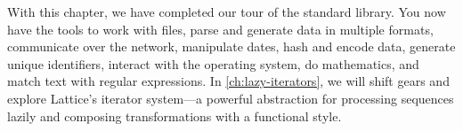 With this chapter, we have completed our tour of the standard library.
You now have the tools to work with files, parse and generate data in
multiple formats, communicate over the network, manipulate dates, hash and
encode data, generate unique identifiers, interact with the operating system,
do mathematics, and match text with regular expressions. In
\cref{ch:lazy-iterators}, we will shift gears and explore Lattice's iterator
system---a powerful abstraction for processing sequences lazily and
composing transformations with a functional style.
